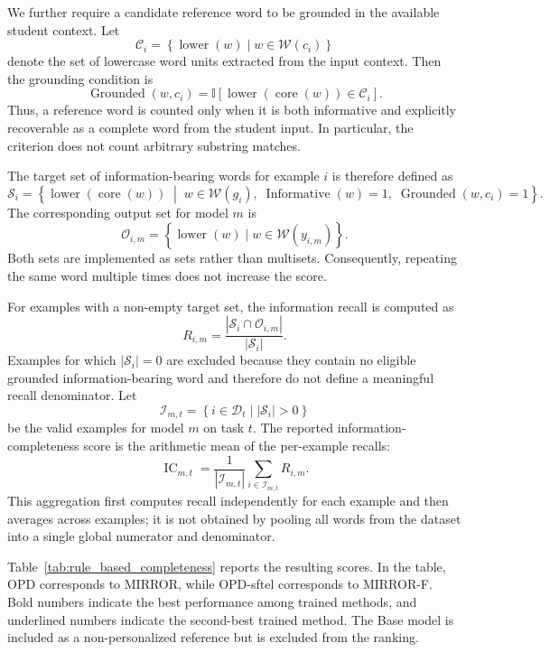 \documentclass{article} %
\begin{document}
We further require a candidate reference word to be grounded in the
available student context. Let
\[
\mathcal{C}_i
=
\left\{
\operatorname{lower}(w)
\mid
w\in\mathcal{W}(c_i)
\right\}
\]
denote the set of lowercase word units extracted from the input context.
Then the grounding condition is
\[
\operatorname{Grounded}(w,c_i)
=
\mathbb{I}\left[
\operatorname{lower}(\operatorname{core}(w))
\in \mathcal{C}_i
\right].
\]
Thus, a reference word is counted only when it is both informative and
explicitly recoverable as a complete word from the student input. In
particular, the criterion does not count arbitrary substring matches.

The target set of information-bearing words for example $i$ is therefore
defined as
\[
\mathcal{S}_i
=
\left\{
\operatorname{lower}(\operatorname{core}(w))
\;\middle|\;
w\in\mathcal{W}(g_i),
\;
\operatorname{Informative}(w)=1,
\;
\operatorname{Grounded}(w,c_i)=1
\right\}.
\]
The corresponding output set for model $m$ is
\[
\mathcal{O}_{i,m}
=
\left\{
\operatorname{lower}(w)
\mid
w\in\mathcal{W}(y_{i,m})
\right\}.
\]
Both sets are implemented as sets rather than multisets. Consequently,
repeating the same word multiple times does not increase the score.

For examples with a non-empty target set, the information recall is
computed as
\[
R_{i,m}
=
\frac{
\left|\mathcal{S}_i\cap\mathcal{O}_{i,m}\right|
}{
\left|\mathcal{S}_i\right|
}.
\]
Examples for which $\left|\mathcal{S}_i\right|=0$ are excluded because they
contain no eligible grounded information-bearing word and therefore do not
define a meaningful recall denominator. Let
\[
\mathcal{I}_{m,t}
=
\left\{
i\in\mathcal{D}_t
\mid
|\mathcal{S}_i|>0
\right\}
\]
be the valid examples for model $m$ on task $t$. The reported
information-completeness score is the arithmetic mean of the per-example
recalls:
\[
\operatorname{IC}_{m,t}
=
\frac{1}{|\mathcal{I}_{m,t}|}
\sum_{i\in\mathcal{I}_{m,t}}
R_{i,m}.
\]
This aggregation first computes recall independently for each example and
then averages across examples; it is not obtained by pooling all words from
the dataset into a single global numerator and denominator.

Table~\ref{tab:rule_based_completeness} reports the resulting scores. In the
table, OPD corresponds to MIRROR, while OPD-sftel corresponds to MIRROR-F.
Bold numbers indicate the best performance among trained methods, and
underlined numbers indicate the second-best trained method. The Base model is
included as a non-personalized reference but is excluded from the ranking.
\end{document}
